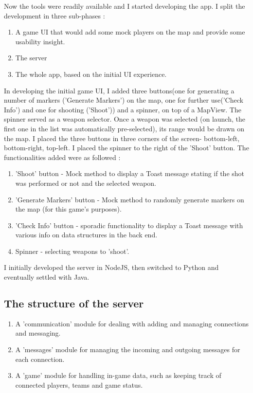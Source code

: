 \documentclass{article}
\begin{document}
Now the tools were readily available and I started developing the app. I split
the development in three sub-phases : 
\begin{enumerate}
  \item A game UI that would add some mock players on the map and provide some
  usability insight.
  \item The server
  \item The whole app, based on the initial UI experience.
\end{enumerate}

In developing the initial game UI, I added three buttons(one for generating a
number of markers ('Generate Markers') on the map, one for further use('Check
Info') and one for shooting ('Shoot')) and a spinner, on top of a MapView. The
spinner served as a weapon selector. Once a weapon was selected (on launch, the
first one in the list was automatically pre-selected), its range would be
drawn on the map. I placed the three buttons in three corners of the screen-
bottom-left, bottom-right, top-left. I placed the spinner to the right of the
'Shoot' button. The functionalities added were as followed :

\begin{enumerate}
  \item 'Shoot' button - Mock method to display a Toast message stating if the
  shot was performed or not and the selected weapon.
  
  \item 'Generate Markers' button - Mock method to randomly generate markers on
  the map (for this game's purposes).
  
  \item 'Check Info' button - sporadic functionality to display a Toast message
  with various info on data structures in the back end.
  
  \item Spinner - selecting weapons to 'shoot'. 
\end{enumerate}

I initially developed the server in NodeJS, then switched to Python and
eventually settled with Java.\newline

\subsection{The structure of the server}
 
\begin{enumerate}
  
  \item A 'communication' module for dealing with adding and managing
  connections and messaging.
  
  \item A 'messages' module for managing the incoming and outgoing messages for
  each connection.
  
  \item A 'game' module for handling in-game data, such as keeping track of
  connected players, teams and game status. 
  
\end{enumerate}
\end{document}
